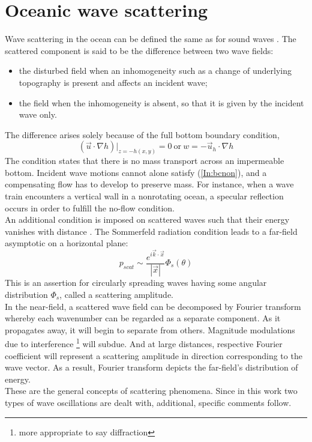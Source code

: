 \documentclass[12pt]{article}
\begin{document}
\section{Oceanic wave scattering}
Wave scattering in the ocean can be defined the same as for sound waves \citep{Lighthill2001}. The 
scattered component is said to be the difference between two wave fields:
\begin{itemize}
	\item the disturbed field when an inhomogeneity such as a change of underlying topography is 
	present and affects an incident wave;
	\item the field when the inhomogeneity is absent, so that it is given by the incident wave 
	only.
\end{itemize}
The difference arises solely because of the full bottom boundary condition,
\begin{equation}
( \vec{u} \cdot \nabla h )|_{z = -h(x, y)} = 0~\text{or}~w = - \vec{u}_h \cdot \nabla h 
\label{In:bcnon} 
\end{equation}
The condition states that there is no mass transport across an impermeable bottom. Incident wave 
motions cannot alone satisfy (\ref{In:bcnon}), and a compensating flow has to develop to preserve 
mass. For instance, when a wave train encounters a vertical wall in a nonrotating ocean, 
a specular reflection occurs in order to fulfill the no-flow condition.\\
An additional condition is imposed on scattered waves such that their energy vanishes with distance 
\citep{mei1989theory, morse1946methods, olbers1981formal}. The Sommerfeld radiation condition leads 
to a far-field asymptotic on a horizontal plane:
\begin{equation}
\label{In:def.scamp}
p_{scat} \sim \frac{e^{i \vec{k} \cdot \vec{x}}}{|\vec{x}|} \Phi_s (\theta)
\end{equation}
This is an assertion for circularly spreading waves having some angular distribution $\Phi_s$, 
called a scattering amplitude.\\
In the near-field, a scattered wave field can be decomposed by Fourier transform whereby each 
wavenumber can be regarded as a separate component. As it propagates away, it will begin to 
separate from others. Magnitude modulations due to interference \footnote{more appropriate to say 
diffraction} will subdue. And at large distances, respective Fourier coefficient will represent a 
scattering amplitude in direction corresponding to the wave vector. As a result, Fourier transform 
depicts the far-field's distribution of energy.\\
These are the general concepts of scattering phenomena. Since in this work two types of 
wave oscillations are dealt with, additional, specific comments follow.
\end{document}
